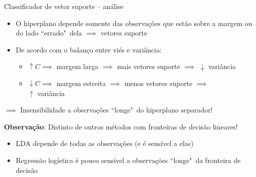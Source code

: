 

\begin{frame}{Classificador de vetor suporte -- análise}
    \begin{itemize}
        \item O hiperplano depende somente das observações que estão sobre a margem ou do lado ``errado"~dela $\implies$ \alert{vetores suporte}
        
        \pause
        
        \item De acordo com o balanço entre viés e variância:
        \begin{itemize}
            \item $\uparrow C \implies$ margem larga $\implies$ mais vetores suporte $\implies$ $\downarrow$ variância
            
            \pause
            
            \item $\downarrow C \implies$ margem estreita $\implies$ menos vetores suporte $\implies$ \\ $\uparrow$ variância
        \end{itemize}
    \end{itemize}
    
    \pause
    
    \begin{center}
        $\implies$ Insensibilidade a observações ``longe"~do hiperplano separador!
    \end{center}
    
    \pause
    
    \textbf{Observação}: Distinto de outros métodos com fronteiras de decisão lineares!
    
    \pause
    
    \begin{itemize}
        \item LDA depende de todas as observações (e é sensível a elas)
        
        \pause
        
        \item Regressão logística é pouco sensível a observações ``longe"~da fronteira de decisão
    \end{itemize}
\end{frame}


